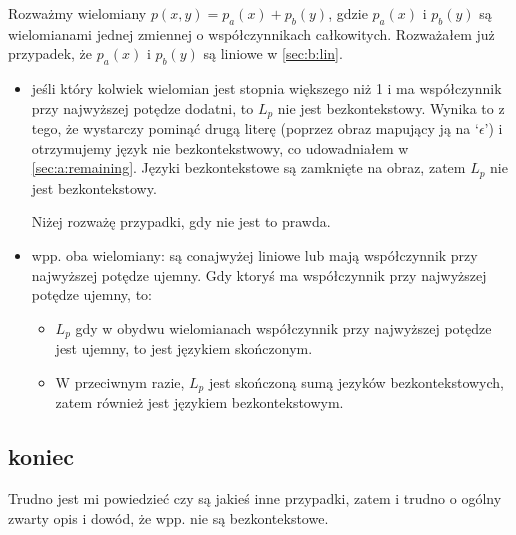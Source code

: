 \documentclass{article}
\theoremstyle{definition}
\theoremstyle{remark}
\begin{document}
Rozważmy wielomiany \(p(x,y) = p_a(x) + p_b(y)\), gdzie \(p_a(x)\) i \(p_b(y)\) są wielomianami jednej zmiennej o współczynnikach całkowitych.
Rozważałem już przypadek, że \(p_a(x)\) i \(p_b(y)\) są liniowe w \ref{sec:b:lin}.

\begin{itemize}
    \item jeśli który kolwiek wielomian jest stopnia większego niż 1 i ma współczynnik przy najwyższej potędze dodatni,
    to \(L_p\) nie jest bezkontekstowy. Wynika to z tego, że wystarczy pominąć drugą literę (poprzez obraz mapujący ją na `$\epsilon$')
    i otrzymujemy język nie bezkontekstwowy, co udowadniałem w \ref{sec:a:remaining}.
    Języki bezkontekstowe są zamknięte na obraz,
    zatem \(L_p\) nie jest bezkontekstowy.

    Niżej rozważę przypadki, gdy nie jest to prawda.
    
    \item wpp. oba wielomiany: są conajwyżej liniowe lub mają współczynnik przy najwyższej potędze ujemny.
    Gdy ktoryś ma współczynnik przy najwyższej potędze ujemny, to:
    \begin{itemize}
        \item \(L_p\) gdy w obydwu wielomianach współczynnik przy najwyższej potędze jest ujemny, to jest językiem skończonym.
        \item W przeciwnym razie, \(L_p\) jest skończoną sumą jezyków bezkontekstowych,
        zatem również jest językiem bezkontekstowym.
    \end{itemize}
\end{itemize}

\subsection{koniec}

Trudno jest mi powiedzieć czy są jakieś inne przypadki, zatem i trudno o ogólny zwarty opis i dowód, że wpp. nie są bezkontekstowe.
\end{document}
